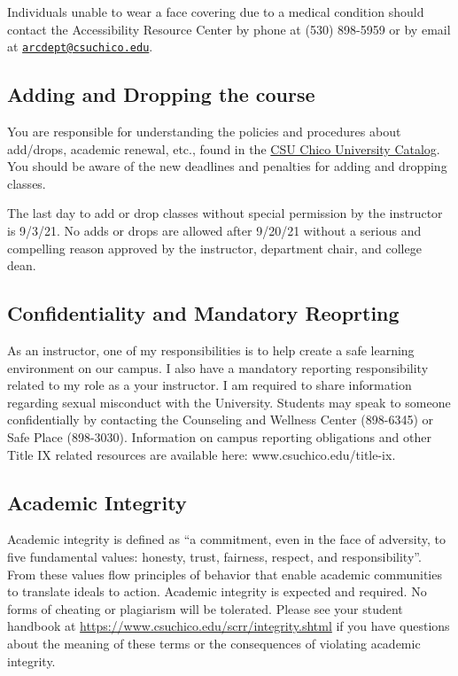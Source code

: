 \documentclass[
]{article}
\begin{document}
Individuals unable to wear a face covering due to a medical condition
should contact the Accessibility Resource Center by phone at (530)
898-5959 or by email at
\href{mailto:arcdept@csuchico.edu}{\nolinkurl{arcdept@csuchico.edu}}.

\hypertarget{adding-and-dropping-the-course}{%
\subsection{Adding and Dropping the
course}\label{adding-and-dropping-the-course}}

You are responsible for understanding the policies and procedures about
add/drops, academic renewal, etc., found in the
\href{http://www.csuchico.edu/catalog/}{CSU Chico University Catalog}.
You should be aware of the new deadlines and penalties for adding and
dropping classes.

The last day to add or drop classes without special permission by the
instructor is 9/3/21. No adds or drops are allowed after 9/20/21 without
a serious and compelling reason approved by the instructor, department
chair, and college dean.

\hypertarget{confidentiality-and-mandatory-reoprting}{%
\subsection{Confidentiality and Mandatory
Reoprting}\label{confidentiality-and-mandatory-reoprting}}

As an instructor, one of my responsibilities is to help create a safe
learning environment on our campus. I also have a mandatory reporting
responsibility related to my role as a your instructor. I am required to
share information regarding sexual misconduct with the University.
Students may speak to someone confidentially by contacting the
Counseling and Wellness Center (898-6345) or Safe Place (898-3030).
Information on campus reporting obligations and other Title IX related
resources are available here: www.csuchico.edu/title-ix.

\hypertarget{academic-integrity}{%
\subsection{Academic Integrity}\label{academic-integrity}}

Academic integrity is defined as ``a commitment, even in the face of
adversity, to five fundamental values: honesty, trust, fairness,
respect, and responsibility''. From these values flow principles of
behavior that enable academic communities to translate ideals to action.
Academic integrity is expected and required. No forms of cheating or
plagiarism will be tolerated. Please see your student handbook at
\url{https://www.csuchico.edu/scrr/integrity.shtml} if you have
questions about the meaning of these terms or the consequences of
violating academic integrity.
\end{document}
